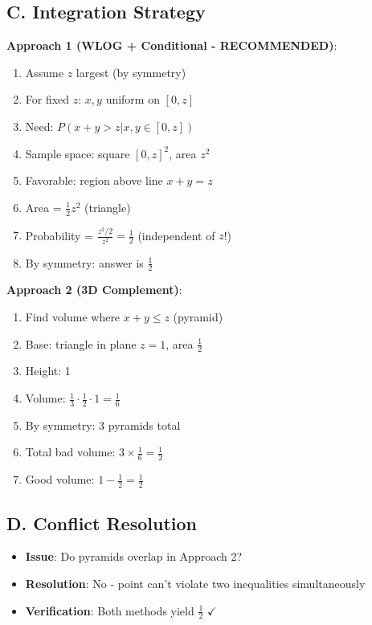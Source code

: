 \documentclass[11pt]{article}
\begin{document}
\begin{conversionbox}
\subsection*{C. Integration Strategy}

\textbf{Approach 1 (WLOG + Conditional - RECOMMENDED)}:
\begin{enumerate}
    \item Assume $z$ largest (by symmetry)
    \item For fixed $z$: $x, y$ uniform on $[0,z]$
    \item Need: $P(x+y>z | x,y \in [0,z])$
    \item Sample space: square $[0,z]^2$, area $z^2$
    \item Favorable: region above line $x+y=z$
    \item Area = $\frac{1}{2}z^2$ (triangle)
    \item Probability = $\frac{z^2/2}{z^2} = \frac{1}{2}$ (independent of $z$!)
    \item By symmetry: answer is $\frac{1}{2}$
\end{enumerate}

\textbf{Approach 2 (3D Complement)}:
\begin{enumerate}
    \item Find volume where $x+y \leq z$ (pyramid)
    \item Base: triangle in plane $z=1$, area $\frac{1}{2}$
    \item Height: 1
    \item Volume: $\frac{1}{3} \cdot \frac{1}{2} \cdot 1 = \frac{1}{6}$
    \item By symmetry: 3 pyramids total
    \item Total bad volume: $3 \times \frac{1}{6} = \frac{1}{2}$
    \item Good volume: $1 - \frac{1}{2} = \frac{1}{2}$
\end{enumerate}

\subsection*{D. Conflict Resolution}
\begin{itemize}[leftmargin=*]
    \item \textbf{Issue}: Do pyramids overlap in Approach 2?
    \item \textbf{Resolution}: No - point can't violate two inequalities simultaneously
    \item \textbf{Verification}: Both methods yield $\frac{1}{2}$ $\checkmark$
\end{itemize}
\end{conversionbox}
\end{document}
